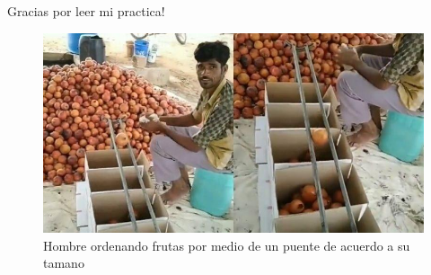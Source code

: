 \documentclass{article}
\begin{document}
	Gracias por leer mi practica!
	
	\begin{figure}[H]
		\centering
		\includegraphics[scale = 0.5]{images/fruits.jpg}
		\caption*{Hombre ordenando frutas por medio de un puente de acuerdo a su tamano}		
	\end{figure}
	
	
	
	
	
	
\end{document}
